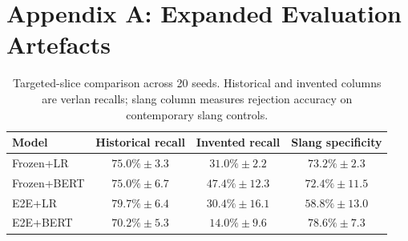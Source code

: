 \documentclass[12pt]{article}
\newif\ifskipsectionclear
\begin{document}
\cleardoublepage
\skipsectioncleartrue
{}
\setcounter{page}{1}
\appendix
\setcounter{secnumdepth}{0}

\section{Appendix A: Expanded Evaluation Artefacts}

\begin{table}[H]
    \centering
    \footnotesize
    \caption{Hold-out test aggregates (20 seeds) for trained detectors. Percentages report mean $\pm$ standard deviation across seeds; counts are means.}
    \label{tab:appendix-holdout-aggregates}
\end{table}

\begin{table}[H]
    \centering
    \footnotesize
    \begin{tabular}{lccc}
        \hline
        Model & Historical recall & Invented recall & Slang specificity \\
        \hline
        Frozen+LR & $75.0\%\pm3.3$ & $31.0\%\pm2.2$ & $73.2\%\pm2.3$ \\
        Frozen+BERT & $75.0\%\pm6.7$ & $47.4\%\pm12.3$ & $72.4\%\pm11.5$ \\
        E2E+LR & $79.7\%\pm6.4$ & $30.4\%\pm16.1$ & $58.8\%\pm13.0$ \\
        E2E+BERT & $70.2\%\pm5.3$ & $14.0\%\pm9.6$ & $78.6\%\pm7.3$ \\
        \hline
    \end{tabular}
    \caption{Targeted-slice comparison across 20 seeds. Historical and invented columns are verlan recalls; slang column measures rejection accuracy on contemporary slang controls.}
    \label{tab:appendix-targeted-metrics}
\end{table}
\end{document}
